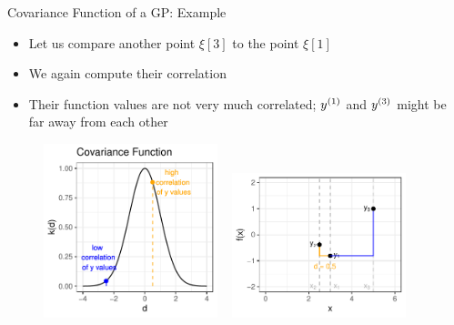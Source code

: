 \documentclass[11pt,compress,t,notes=noshow, xcolor=table]{beamer}
\begin{document}
\begin{vbframe}{Covariance Function of a GP: Example} 

\begin{itemize}
  \item Let us compare another point $\xi[3]$ to the point $\xi[1]$
  \item We again compute their correlation
  \item Their function values are not very much correlated; $\yi[1]$ and $\yi[3]$ might be far away from each other
\end{itemize}

\begin{figure}
  \includegraphics[width=0.45\textwidth]{figure/covariance2point/example_covariance_2.pdf} ~      \includegraphics[width=0.45\textwidth]{figure/covariance2point/example_function_2_1.pdf}
\end{figure}

\end{vbframe}



\end{document}
